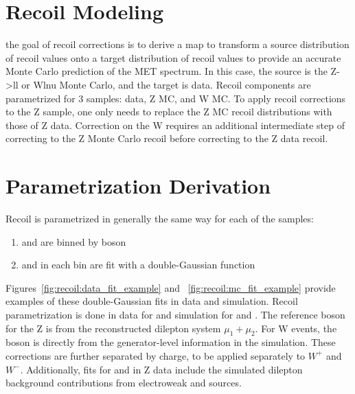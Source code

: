 
\section{Recoil Modeling} \label{ch:recoil:modeling}
the goal of recoil corrections is to derive a map to transform a source distribution of recoil values onto a target distribution of recoil values to provide an accurate Monte Carlo prediction of the MET spectrum. In this case, the source is the Z->ll or Wlnu Monte Carlo, and the target is data. Recoil components are parametrized for 3 samples: data, Z MC, and W MC. To apply recoil corrections to the Z sample, one only needs to replace the Z MC recoil distributions with those of Z data. Correction on the W requires an additional intermediate step of correcting to the Z Monte Carlo recoil before correcting to the Z data recoil.

\section{Parametrization Derivation}
Recoil is parametrized in generally the same way for each of the samples:
\begin{enumerate}
\item \upar and \uprp are binned by boson \pt
\item \upar and \uprp  in each \pt bin are fit with a double-Gaussian function
\end{enumerate}
Figures~\ref{fig:recoil:data_fit_example}
 and ~\ref{fig:recoil:mc_fit_example} provide examples of these double-Gaussian fits in data and simulation. Recoil parametrization is done in data for \zmm and simulation for \zmm and \wmunu. The reference boson \pt for the Z is from the reconstructed dilepton system $\mu_1+\mu_2$. For W events, the boson \pt is directly   from the generator-level information in the simulation. These corrections are further separated by charge, to be applied separately to $W^+$ and $W^-$.
Additionally, fits for \upar and \uprp in Z data include the simulated dilepton background contributions from electroweak and \ttbar sources.






